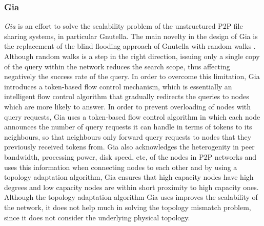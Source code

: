 \subsubsection{Gia}
\emph{Gia} \cite{chawathe_gia_2003} is an effort to solve the scalability
problem of the unstructured P2P file sharing systems, in particular Gnutella.
The main novelty in the design of Gia is the replacement of the blind flooding
approach of Gnutella with random walks \cite{lv_randomwalks_2002}. Although
random walks is a step in the right direction, issuing only a single copy of the
query within the network reduces the search scope, thus affecting negatively the
success rate of the query.  In order to overcome this limitation, Gia introduces
a token-based flow control mechanism, which is essentially an intelligent flow
control algorithm that gradually redirects the queries to nodes which are more
likely to answer. In order to prevent overloading of nodes with query requests,
Gia uses a token-based flow control algorithm in which each node announces the
number of query requests it can handle in terms of tokens to its neighbours, so
that neighbours only forward query requests to nodes that they previously
received tokens from. Gia also acknowledges the heterogenity in peer bandwidth,
processing power, disk speed, etc, of the nodes in P2P networks and uses this
information when connecting nodes to each other and by using a topology
adaptation algorithm, Gia ensures that high capacity nodes have high degrees and
low capacity nodes are within short proximity to high capacity ones.
Although the topology adaptation algorithm Gia uses improves the scalability of
the network, it does not help much in solving the topology mismatch problem,
since it does not consider the underlying physical topology.


